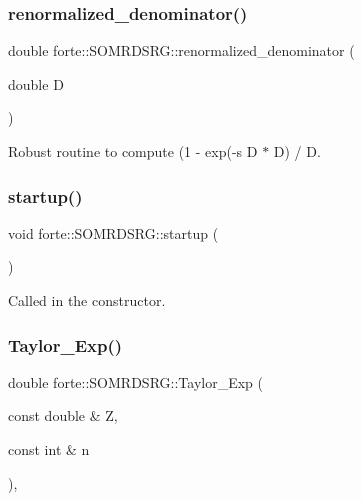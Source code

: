 \subsubsection{\texorpdfstring{renormalized\+\_\+denominator()}{renormalized\_denominator()}}
{\footnotesize\ttfamily double forte\+::\+S\+O\+M\+R\+D\+S\+R\+G\+::renormalized\+\_\+denominator (\begin{DoxyParamCaption}\item[{double}]{D }\end{DoxyParamCaption})\hspace{0.3cm}{\ttfamily [protected]}}



Robust routine to compute (1 -\/ exp(-\/s D $\ast$ D) / D. 

\mbox{\label{classforte_1_1_s_o_m_r_d_s_r_g_a5c988f472bf263321c43696c10b67b91}} 
\subsubsection{\texorpdfstring{startup()}{startup()}}
{\footnotesize\ttfamily void forte\+::\+S\+O\+M\+R\+D\+S\+R\+G\+::startup (\begin{DoxyParamCaption}{ }\end{DoxyParamCaption})\hspace{0.3cm}{\ttfamily [protected]}}



Called in the constructor. 

\mbox{\label{classforte_1_1_s_o_m_r_d_s_r_g_a71e71effcdf8598118080c8b8692dcb9}} 
\subsubsection{\texorpdfstring{Taylor\+\_\+\+Exp()}{Taylor\_Exp()}}
{\footnotesize\ttfamily double forte\+::\+S\+O\+M\+R\+D\+S\+R\+G\+::\+Taylor\+\_\+\+Exp (\begin{DoxyParamCaption}\item[{const double \&}]{Z,  }\item[{const int \&}]{n }\end{DoxyParamCaption})\hspace{0.3cm}{\ttfamily [inline]}, {\ttfamily [protected]}}

